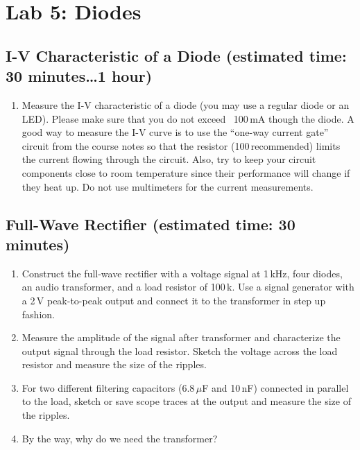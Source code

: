 \documentclass{article}
\begin{document}
\section{Lab 5: Diodes}

\subsection{I-V Characteristic of a Diode (estimated time: 30 minutes\ldots 1 hour)}
\begin{enumerate}
\item Measure the I-V characteristic of a diode (you may use a regular diode or an LED). Please make sure that you do not exceed ~100\,mA though the diode. A good way to measure the I-V curve is to use the ``one-way current gate'' circuit from the course notes so that the resistor (100\,\Ohm recommended) limits the current flowing through the circuit. Also, try to keep your circuit components close to room temperature since their performance will change if they heat up. Do not use multimeters for the current measurements.
\end{enumerate}

\subsection{Full-Wave Rectifier (estimated time: 30 minutes)}
\label{lab:full-wave-rectifier}
\begin{enumerate}
\item Construct the full-wave rectifier with a voltage signal at 1\,kHz, four diodes, an audio transformer, and a load resistor of 100\,k\Ohm. Use a signal generator with a 2\,V peak-to-peak output and connect it to the transformer in step up fashion.
\item Measure the amplitude of the signal after transformer and characterize the output signal through the load resistor. Sketch the voltage across the load resistor and measure the size of the ripples.
\item For two different filtering capacitors ($6.8\,\mu$F and 10\,nF) connected in parallel to the load, sketch or save scope traces at the output and measure the size of the ripples.
\item By the way, why do we need the transformer?
\end{enumerate}
\end{document}
